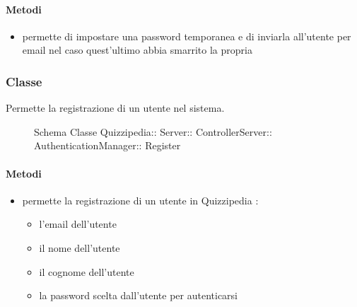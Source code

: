 \paragraph{Metodi}
\begin{itemize}
\item {}
\newline
permette di impostare una password temporanea e di inviarla all'utente per email nel caso quest'ultimo abbia smarrito la propria
\newline
\end{itemize}
\subsubsection{Classe }
Permette la registrazione di un utente nel sistema.
\begin{figure}[H]
\centering
\noindent{}
\caption[Schema Classe Register]{Schema Classe Quizzipedia:: Server:: ControllerServer:: AuthenticationManager:: Register}
\end{figure}
\paragraph{Metodi}
\begin{itemize}
\item {}
\newline
permette la registrazione di un utente in Quizzipedia
\newline
{} :
\begin{itemize}
\item {}
\newline
l'email dell'utente
\item {}
\newline
il nome dell'utente
\item {}
\newline
il cognome dell'utente
\item {}
\newline
la password scelta dall'utente per autenticarsi
\end{itemize}
\end{itemize}
